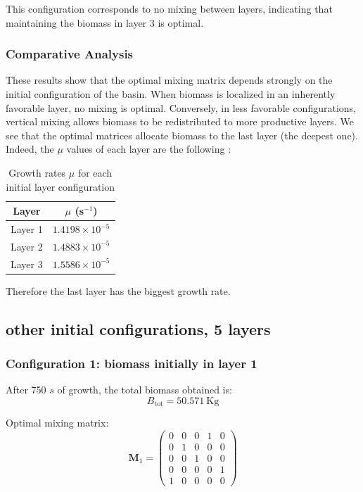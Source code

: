 \documentclass{article}
\begin{document}
This configuration corresponds to no mixing between layers,
indicating that maintaining the biomass in layer 3 is optimal.


\subsubsection{Comparative Analysis}

These results show that the optimal mixing matrix depends strongly on the initial configuration of the basin.
When biomass is localized in an inherently favorable layer,
no mixing is optimal.
Conversely, in less favorable configurations,
vertical mixing allows biomass to be redistributed to more productive layers. We see that the optimal matrices allocate biomass to the last layer (the deepest one).
Indeed, the $\mu$ values of each layer are the following :

\begin{table}[H]
\centering
\begin{tabular}{|c|c|}
\hline
\textbf{Layer} & \textbf{$\mu$ (s$^{-1}$)} \\
\hline
Layer 1 & $1.4198 \times 10^{-5}$ \\
Layer 2 & $1.4883 \times 10^{-5}$ \\
Layer 3 & $1.5586 \times 10^{-5}$ \\
\hline
\end{tabular}
\caption{Growth rates $\mu$ for each initial layer configuration}
\label{tab:mu_layers}
\end{table}

Therefore the last layer has the biggest growth rate.

\subsection{other initial configurations, 5 layers}

\subsubsection{Configuration 1: biomass initially in layer 1}
After 750 $s$ of growth, the total biomass obtained is:
\[
B_{\text{tot}} = 50.571 \ \mathrm{Kg}
\]

Optimal mixing matrix:
\[
\mathbf{M}_1 =
\begin{pmatrix}
0 & 0 & 0 & 1 & 0 \\
0 & 1 & 0 & 0 & 0 \\
0 & 0 & 1 & 0 & 0 \\
0 & 0 & 0 & 0 & 1 \\
1 & 0 & 0 & 0 & 0
\end{pmatrix}
\]
\end{document}
